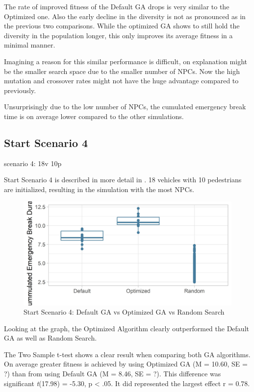 The rate of improved fitness of the Default GA drops is very similar to the Optimized one. Also the early decline in the diversity is not as pronounced as in the previous two comparisons. While the optimized GA shows to still hold the diversity in the population longer, this only improves its average fitness in a minimal manner.

Imagining a reason for this similar performance is difficult, on explanation might be the smaller search space due to the smaller number of NPCs. Now the high mutation and crossover rates might not have the huge advantage compared to previously.

Unsurprisingly due to the low number of NPCs, the cumulated emergency break time is on average lower compared to the other simulations.

\subsection{Start Scenario 4}
scenario 4: 18v 10p

Start Scenario 4 is described in more detail in . 18 vehicles with 10 pedestrians are initialized, resulting in the simulation with the most NPCs.

\begin{figure}[ht] 
	\label{figure:sim_4_comparison}
	\includegraphics[width=1\linewidth]{simulations/evaluation/plots/sim_4_comparison}
	\caption{Start Scenario 4: Default GA vs Optimized GA vs Random Search}
\end{figure}

Looking at the graph, the Optimized Algorithm clearly outperformed the Default GA as well as Random Search.

The Two Sample t-test shows a clear result when comparing both GA algorithms. On average greater fitness is achieved by using Optimized GA (M = 10.60, SE = ?) than from using Default GA (M = 8.46, SE = ?). This difference was significant \textit{t}(17.98) = -5.30, p < .05. It did represented the largest effect r = 0.78.


